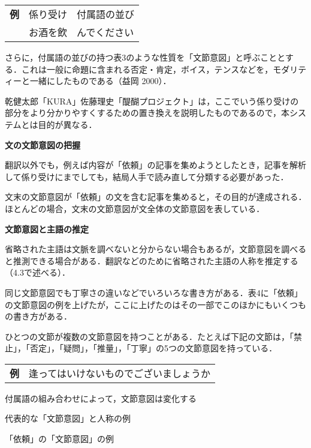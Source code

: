 \documentclass[japanese]{jnlp_1.4}
\begin{document}
\vspace{0.3zw}
\begin{tabular}{lll}
{\bfseries 例} & 係り受け & 付属語の並び \\
	& お酒を飲 & んでください
\end{tabular}
\vspace{0.3zw}

さらに，付属語の並びの持つ表3のような性質を「文節意図」と呼ぶこととする．これは一般に命題に含まれる否定・肯定，ボイス，テンスなどを，モダリティーと一緒にしたものである（益岡 2000）．

乾健太郎「KURA」佐藤理史「醍醐プロジェクト」は，ここでいう係り受けの部分をより分かりやすくするための置き換えを説明したものであるので，本システムとは目的が異なる．


{\bfseries 文の文節意図の把握}

翻訳以外でも，例えば内容が「依頼」の記事を集めようとしたとき，記事を解析して係り受けにまでしても，結局人手で読み直して分類する必要があった．

文末の文節意図が「依頼」の文を含む記事を集めると，その目的が達成される．ほとんどの場合，文末の文節意図が文全体の文節意図を表している．

{\bfseries 文節意図と主語の推定}

省略された主語は文脈を調べないと分からない場合もあるが，文節意図を調べると推測できる場合がある．翻訳などのために省略された主語の人称を推定する（4.3で述べる）．

同じ文節意図でも丁寧さの違いなどでいろいろな書き方がある．表4に「依頼」の文節意図の例を上げたが，ここに上げたのはその一部でこのほかにもいくつもの書き方がある．


ひとつの文節が複数の文節意図を持つことがある．たとえば下記の文節は，「禁止」，「否定」，「疑問」，「推量」，「丁寧」の5つの文節意図を持っている．

\vspace{0.3zw}
\begin{tabular}{ll}
{\bfseries 例} & 逢ってはいけないものでございましょうか \\
\end{tabular}
\vspace{0.3zw}

付属語の組み合わせによって，文節意図は変化する

\begin{table}[t]
 \caption{代表的な「文節意図」と人称の例}

\end{table}
\begin{table}[t]
 \caption{「依頼」の「文節意図」の例}

\end{table}
\end{document}
